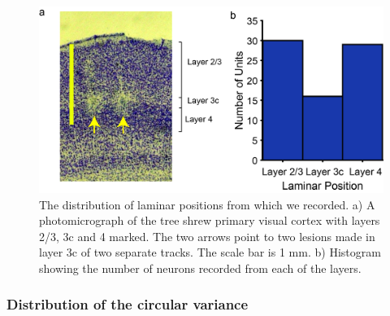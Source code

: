 	\begin{figure}[H]
	
	\includegraphics[width=\linewidth]{ShrewV1/LaminarPosition.jpg}
	\caption{The distribution of laminar positions from which we recorded. a) A photomicrograph of the tree shrew primary visual cortex with layers 2/3, 3c and 4 marked. The two arrows point to two lesions made in layer 3c of two separate tracks. The scale bar is 1 mm. b) Histogram showing the number of neurons recorded from each of the layers.}
	\label{fig:lp}
\end{figure} 

\subsubsection{Distribution of the circular variance}

